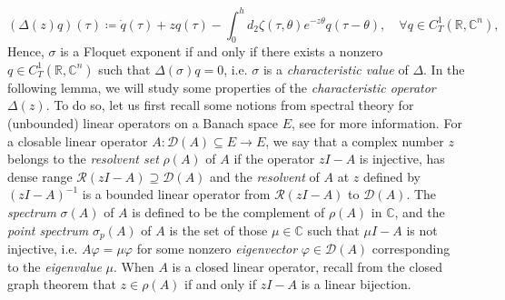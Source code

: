 \documentclass[english]{myarticle}
\begin{document}
\begin{sloppypar}
\begin{equation}
    (\Delta(z)q)(\tau) \coloneqq \dot{q}(\tau) + z q(\tau) - \int_0^h d_2 \zeta (\tau,\theta) e^{-z \theta} q(\tau-\theta), \quad \forall q \in C_T^1(\mathbb{R},\mathbb{C}^n),
\end{equation}
Hence, $\sigma$ is a Floquet exponent if and only if there exists a nonzero $q \in C_T^1(\mathbb{R},\mathbb{C}^n)$ such that $\Delta(\sigma)q = 0$, i.e. $\sigma$ is a \emph{characteristic value} of $\Delta$. In the following lemma, we will study some properties of the \emph{characteristic operator} $\Delta(z)$. To do so, let us first recall some notions from spectral theory for (unbounded) linear operators on a Banach space $E$, see \cite{Engel2000,Hille1957,Taylor1986} for more information. For a closable linear operator $A: \mathcal{D}(A) \subseteq E \to E$, we say that a complex number $z$ belongs to the \emph{resolvent set} $\rho(A)$ of $A$ if the operator $zI - A$ is injective, has dense range $\mathcal{R}(zI-A) \supseteq \mathcal{D}(A)$ and the \emph{resolvent} of $A$ at $z$ defined by $(z I - A)^{-1}$ is a bounded linear operator from $\mathcal{R}(zI-A)$ to $\mathcal{D}(A)$. The \emph{spectrum} $\sigma(A)$ of $A$ is defined to be the complement of $\rho(A)$ in $\mathbb{C}$, and the \emph{point spectrum} $\sigma_p(A)$ of $A$ is the set of those $\mu \in \mathbb{C}$ such that $\mu I - A$ is not injective, i.e. $A \varphi = \mu \varphi$ for some nonzero \emph{eigenvector} $\varphi \in \mathcal{D}(A)$ corresponding to the \emph{eigenvalue} $\mu$. When $A$ is a closed linear operator, recall from the closed graph theorem that $z \in \rho(A)$ if and only if $zI - A$ is a linear bijection.


\end{sloppypar}
\end{document}
